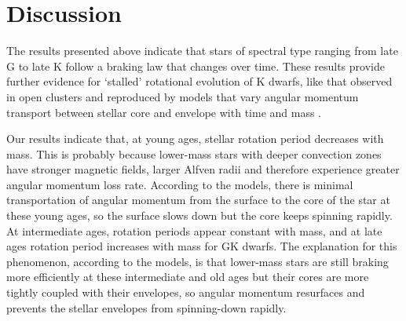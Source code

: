 \section{Discussion}
\label{sec:discussion}


The results presented above indicate that stars of spectral type ranging from
late G to late K follow a braking law that changes over time.
These results provide further evidence for `stalled' rotational evolution of K
dwarfs, like that observed in open clusters \citep{curtis2019} and reproduced
by models that vary angular momentum transport between stellar core and
envelope with time and mass \citep{spada2019}.

Our results indicate that, at young ages, stellar rotation period decreases
with mass.
This is probably because lower-mass stars with deeper convection zones have
stronger magnetic fields, larger Alfven radii and therefore experience greater
angular momentum loss rate.
According to the \citet{spada2019} models, there is minimal transportation of
angular momentum from the surface to the core of the star at these young ages,
so the surface slows down but the core keeps spinning rapidly.
At intermediate ages, rotation periods appear constant with mass, and at late
ages rotation period increases with mass for GK dwarfs.
The explanation for this phenomenon, according to the \citet{spada2019}
models, is that lower-mass stars are still braking more efficiently at these
intermediate and old ages but their cores are more tightly coupled with their
envelopes, so angular momentum resurfaces and prevents the stellar envelopes
from spinning-down rapidly.

